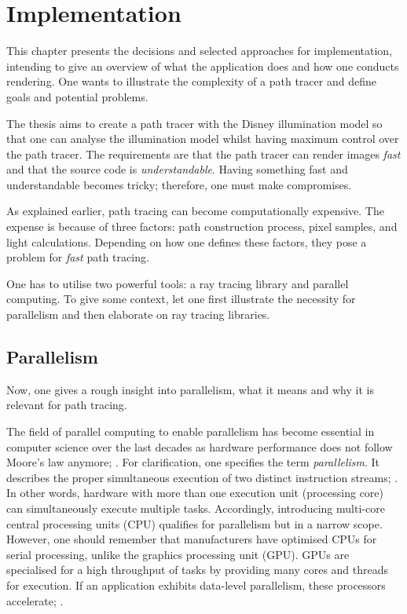 \chapter{Implementation}

This chapter presents the decisions and selected approaches for implementation, intending to give an overview of what the application does and how one conducts rendering.
One wants to illustrate the complexity of a path tracer and define goals and potential problems.

The thesis aims to create a path tracer with the Disney illumination model so that one can analyse the illumination model whilst having maximum control over the path tracer.
The requirements are that the path tracer can render images \textit{fast} and that the source code is \textit{understandable}.
Having something fast and understandable becomes tricky; therefore, one must make compromises.

As explained earlier, path tracing can become computationally expensive.
The expense is because of three factors: path construction process, pixel samples, and light calculations.
Depending on how one defines these factors, they pose a problem for \textit{fast} path tracing.

One has to utilise two powerful tools: a ray tracing library and parallel computing.
To give some context, let one first illustrate the necessity for parallelism and then elaborate on ray tracing libraries.

\section{Parallelism}

Now, one gives a rough insight into parallelism, what it means and why it is relevant for path tracing.

The field of parallel computing to enable parallelism has become essential in computer science over the last decades as hardware performance does not follow Moore's law anymore; \cite{theis_end_2017}.
For clarification, one specifies the term \textit{parallelism}.
It describes the proper simultaneous execution of two distinct instruction streams; \cite{laplante_encyclopedia_2017}.
In other words, hardware with more than one execution unit (processing core) can simultaneously execute multiple tasks.
Accordingly, introducing multi-core central processing units (CPU) qualifies for parallelism but in a narrow scope.
However, one should remember that manufacturers have optimised CPUs for serial processing, unlike the graphics processing unit (GPU).
GPUs are specialised for a high throughput of tasks by providing many cores and threads for execution.
If an application exhibits data-level parallelism, these processors accelerate; \cite{laplante_encyclopedia_2017}.

